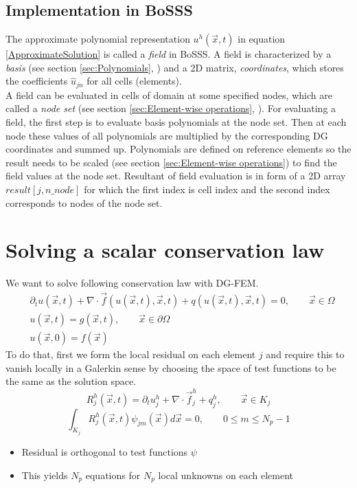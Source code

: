 \documentclass[BoSSSForSolvingConservationLaws.tex]{subfiles}
\begin{document}
\subsection*{Implementation in BoSSS}
The approximate polynomial representation $u^h(\vec{x},t)$ in equation \eqref{ApproximateSolution} is called a \emph{field} in BoSSS. A field is characterized by a \emph{basis} (see section \ref{sec:Polynomials}, ) and a 2D matrix, \emph{coordinates}, which stores the coefficients $\hat u_{jn}$ for all cells (elements).\\
A field can be evaluated in cells of domain at some specified nodes, which are called a \emph{node set} (see section \ref{sec:Element-wise operations}, ). For evaluating a field, the first step is to evaluate basis polynomials at the node set. Then at each node these values of all polynomials are multiplied by the corresponding DG coordinates and summed up. Polynomials are defined on reference elements so the result needs to be scaled (see section \ref{sec:Element-wise operations}) to find the field values at the node set. Resultant of field evaluation is in form of a 2D array $result[j,n\_node]$ for which the first index is cell index and the second index corresponds to nodes of the node set.

\section{Solving a scalar conservation law}
We want to solve following conservation law with DG-FEM.
\begin{subequations}
\label{ScalarConservationLaw}
\begin{align}
  &\partial_t u(\vec{x},t) +\nabla\cdot\vec{f}(u(\vec{x},t),\vec{x},t)
  +q(u(\vec{x},t),\vec{x},t)=0,\qquad\vec{x}\in\Omega \\
  &u(\vec{x},t)=g(\vec{x},t),\qquad \vec{x} \in \partial \Omega \\
  &u(\vec{x},0)=f(\vec{x})
\end{align}
\end{subequations}
To do that, first we form the local residual on each element $j$ and require this to vanish locally in a Galerkin sense by choosing the space of test functions to be the same as the solution space.
\[
R_j^h(\vec{x},t)=\partial_t u_j^h +\nabla\cdot\vec{f}_j^h+q_j^h, \qquad \vec{x} \in K_j
\]
\begin{equation}
\label{residual}
\int_{K_j} R_j^h(\vec{x},t)\psi_{jm}(\vec{x})d\vec{x}=0, \qquad 0\leq m \leq N_p-1
\end{equation}
\begin{itemize}
\item Residual is orthogonal to test functions $\psi$
\item This yields $N_p$ equations for $N_p$ local unknowns on each element
\end{itemize}
\end{document}
